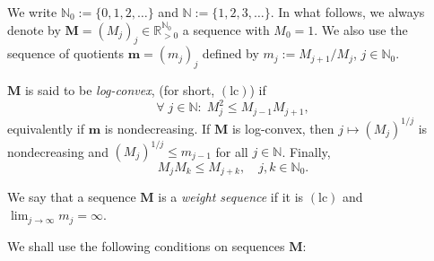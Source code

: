 \documentclass[11pt,a4paper]{article}
\makeatletter
\theoremstyle{plain}
\theoremstyle{definition}
\DeclareRobustCommand\widecheck[1]{{\mathpalette\@widecheck{#1}}}
\def\@widecheck#1#2{%
	\setbox\z@\hbox{\m@th$#1#2$}%
	\setbox\tw@\hbox{\m@th$#1%
		\widehat{%
			\vrule\@width\z@\@height\ht\z@
			\vrule\@height\z@\@width\wd\z@}$}%
	\dp\tw@-\ht\z@
	\@tempdima\ht\z@ \advance\@tempdima2\ht\tw@ \divide\@tempdima\thr@@
	\setbox\tw@\hbox{%
		 \raise\@tempdima\hbox{\scalebox{1}[-1]{\lower\@tempdima\box
				\tw@}}}%
	{\ooalign{\box\tw@ \cr \box\z@}}}
\renewcommand{\check}[1]{\widecheck{#1}}
\renewcommand{\widecheck}[1]{\widecheck{#1}}
\newcommand{\RR}{\mathbb{R}}
\newcommand{\NN}{\mathbb{N}}
\newcommand{\M}{\mathbf{M}}
\newcommand{\m}{\boldsymbol{m}}
\DeclareRobustCommand\widecheck[1]{{\mathpalette\@widecheck{#1}}}
\def\@widecheck#1#2{%
    \setbox\z@\hbox{\m@th$#1#2$}%
    \setbox\tw@\hbox{\m@th$#1%
       \widehat{%
          \vrule\@width\z@\@height\ht\z@
          \vrule\@height\z@\@width\wd\z@}$}%
    \dp\tw@-\ht\z@
    \@tempdima\ht\z@ \advance\@tempdima2\ht\tw@ \divide\@tempdima\thr@@
    \setbox\tw@\hbox{%
       \raise\@tempdima\hbox{\scalebox{1}[-1]{\lower\@tempdima\box
\tw@}}}%
    {\ooalign{\box\tw@ \cr \box\z@}}}
\makeatother
\begin{document}

We write $\NN_0:=\{0,1,2,\dots\}$ and $\NN:=\{1,2,3,\dots\}$. In what follows, we always denote by $\M=(M_j)_j\in\RR_{>0}^{\NN_0}$ a sequence with $M_0=1$.
We also use 
the sequence of quotients $\m=(m_j)_j$ defined by $m_j:=M_{j+1}/M_{j}$, $j\in \NN_0$.

$\M$ is said to be {\itshape log-convex}, (for short, \hypertarget{lc}{$(\text{lc})$}) if
$$\forall\;j\in\NN:\;M_j^2\le M_{j-1} M_{j+1},$$
equivalently if $\m$ is nondecreasing. If $\M$ is log-convex, %
then 
$j\mapsto(M_j)^{1/j}$ is nondecreasing and $(M_j)^{1/j}\le m_{j-1}$ for all $j\in\NN$. Finally,
\begin{equation}\label{eq.alg.from.lc}
M_j M_k\le M_{j+k},\quad j,k\in\NN_0.
\end{equation}

We say that a sequence $\M$ is a \emph{weight sequence} if it is \hyperlink{lc}{$(\text{lc})$} and $\lim_{j\to\infty} m_j =\infty$.

We shall use the following conditions on  sequences $\M$:
\end{document}
